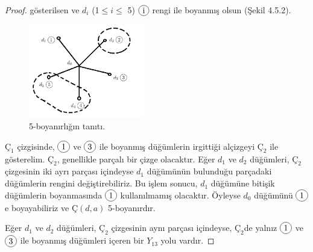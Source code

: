 \documentclass[11pt]{amsbook}
\newcommand*\circled[1]{\tikz[baseline=(char.base)]{
            \node[shape=circle,draw,inner sep=2pt] (char) {#1};}}
\begin{document}
\begin{proof}
gösterilsen ve $d_{i}$ (1$\leq i \leq$ 5)  $\circled{i}$ rengi ile boyanmış olsun (Şekil 4.5.2).

\begin{figure}[htb]
	\centering
	\includegraphics[width=0.45\textwidth]{images/ceyhun-230-fig01}
	\caption{5-boyanırlığın tanıtı.}
\end{figure}

$Ç_{1}$ çizgisinde, $\circled{1}$ ve $\circled{3}$ ile boyanmış düğümlerin irgittiği alçizgeyi $Ç_{2}$ ile gösterelim. $Ç_{2}$, genellikle parçalı bir çizge olacaktır. Eğer $d_{1}$ ve $d_{2}$ düğümleri, $Ç_{2}$ çizgesinin iki ayrı parçası içindeyse $d_{1}$ düğümünün bulunduğu parçadaki düğümlerin rengini değiştirebiliriz. Bu işlem sonucu, $d_{1}$ düğümüne bitişik düğümlerin boyanmasında  $\circled{1}$ kullanılmamış olacaktır. Öyleyse $d_{0}$ düğümünü  $\circled{1}$e boyayabiliriz ve $Ç(d,a)$ 5-boyanırdır.

Eğer $d_{1}$ ve $d_{2}$ düğümleri, $Ç_{2}$ çizgesinin aynı parçası içindeyse, $Ç_{2}$de yalnız $\circled{1}$ ve $\circled{3}$ ile boyanmış düğümleri içeren bir $Y_{13}$ yolu vardır.
\end{proof}
\end{document}
